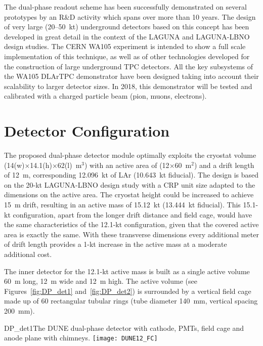 The dual-phase readout scheme has been successfully demonstrated on
several prototypes by an R\&D activity which spans over more than 10
years.  The design of very large (20--50~kt) underground detectors
based on this concept has been developed in great detail in the
context of the LAGUNA and LAGUNA-LBNO design studies.  The CERN WA105
experiment is intended to show a full scale implementation of this
technique, as well as of other technologies developed for the
construction of large underground TPC detectors.  All the key
subsystems of the WA105 DLArTPC demonstrator have been designed
taking into account their scalability to larger detector sizes.  In
2018, this demonstrator will be tested and calibrated with a charged
particle beam (pion, muons, electrons).


\section{Detector Configuration}

The proposed dual-phase detector module %
optimally exploits the cryostat volume %
(14(w)$\times$14.1(h)$\times$62(l)~m$^3$) with an active area  of
(12$\times$60~m$^2$) and a drift length of 12~m, corresponding 
12.096~kt of LAr (10.643~kt fiducial). The design is based on the
20-kt LAGUNA-LBNO design study with a
CRP unit size adapted to the dimensions on the active area. The
cryostat height could be increased to achieve 15~m
drift, resulting in an active mass of
15.12~kt (13.444~kt fiducial).  This 15.1-kt 
configuration, apart from the longer drift distance and field cage,
would have the same characteristics of the 12.1-kt %
configuration, given that the covered active area is exactly the
same. With these transverse dimensions every additional meter of drift
length provides a 1-kt increase in the active mass   at a moderate
additional cost.

The inner detector for the 12.1-kt active mass is built as a single
active volume 60~m long, 12~m wide and 12~m high. The active volume (see
Figures~\ref{fig:DP_det1} and~\ref{fig:DP_det2}) is surrounded
by a vertical field cage made up of 60 rectangular tubular rings 
(tube diameter 140~mm, vertical spacing 200~mm). 
\begin{cdrfigure}{DP_det1}{The DUNE dual-phase 
detector with cathode, PMTs, field cage and anode plane with chimneys.}
\texttt{[image: DUNE12\_FC]}
\end{cdrfigure}

